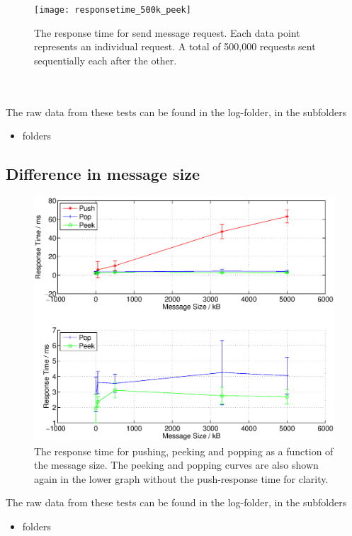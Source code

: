 \documentclass{article}
\begin{document}
                \begin{figure}[H]
                    \texttt{[image: responsetime\_500k\_peek]}
                    \caption{The response time for send message request. Each data point represents an individual request. A total of 500,000 requests sent sequentially each after the other.}
                    \label{fig:responsetime_500k_peek}
                \end{figure}
                ~\\
                \\
                The raw data from these tests can be found in the log-folder, in the subfolders
                \begin{itemize}
                    \item folders
                \end{itemize}

        \subsection{Difference in message size}
            \begin{figure}[H]
                    \hspace{-1.5cm}
                    \includegraphics[scale=0.60]{responsetime_msgsize}
                    \caption{The response time for pushing, peeking and popping as a function of the message size. The peeking and popping curves are also shown again in the lower graph without the push-response time for clarity.}
                    \label{fig:responsetime_msgsize}
                \end{figure}
            The raw data from these tests can be found in the log-folder, in the subfolders
            \begin{itemize}
                \item folders
            \end{itemize}
\end{document}
